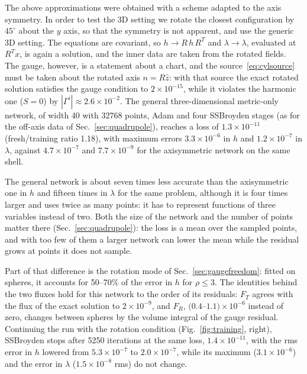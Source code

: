 \documentclass[aps,prd,twocolumn,superscriptaddress, nofootinbib,floatfix]{revtex4-2}
\begin{document}
The above approximations were obtained with a scheme adapted to the axis symmetry.
In order to test the 3D setting we rotate the closest configuration by $45^\circ$ about the $y$ axis, so that the symmetry is not apparent, and use the generic 3D setting.
The equations are covariant, so $h\to R\,h\,R^{T}$ and $\lambda\to\lambda$, evaluated at $R^{T}x$, is again a solution, and the inner data are taken from the rotated fields.
The gauge, however, is a statement about a chart, and the source~\eqref{eq:cylsource} must be taken about the rotated axis $n = R\hat z$: with that source the exact rotated solution satisfies the gauge condition to $2\times10^{-15}$, while it violates the harmonic one ($S=0$) by $|\Gamma^i|\approx2.6\times10^{-2}$.
The general three-dimensional metric-only network, of width 40 with 32768 points, Adam and four SSBroyden stages (as for the off-axis data of Sec.~\ref{sec:quadrupole}), reaches a loss of $1.3\times10^{-11}$ (fresh/training ratio 1.18), with maximum errors $3.3\times10^{-6}$ in $h$ and $1.2\times10^{-7}$ in $\lambda$, against $4.7\times10^{-7}$ and $7.7\times10^{-9}$ for the axisymmetric network on the same shell.

The general network is about seven times less accurate than the axisymmetric one in $h$ and fifteen times in $\lambda$ for the same problem, although it is four times larger and uses twice as many points: it has to represent functions of three variables instead of two.
Both the size of the network and the number of points matter there (Sec.~\ref{sec:quadrupole}): the loss is a mean over the sampled points, and with too few of them a larger network can lower the mean while the residual grows at points it does not sample.

Part of that difference is the rotation mode of Sec.~\ref{sec:gaugefreedom}: fitted on spheres, it accounts for 50--70\% of the error in $h$ for $\rho\le3$.
The identities behind the two fluxes hold for this network to the order of its residuals: $F_T$ agrees with the flux of the exact solution to $2\times10^{-9}$, and $F_R$, $(0.4$--$1.1)\times10^{-6}$ instead of zero, changes between spheres by the volume integral of the gauge residual.
Continuing the run with the rotation condition (Fig.~\ref{fig:training}, right), SSBroyden stops after 5250 iterations at the same loss, $1.4\times10^{-11}$, with the rms error in $h$ lowered from $5.3\times10^{-7}$ to $2.0\times10^{-7}$, while its maximum ($3.1\times10^{-6}$) and the error in $\lambda$ ($1.5\times10^{-8}$ rms) do not change.
\end{document}
